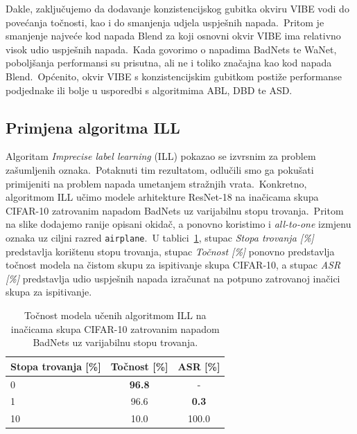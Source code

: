 \documentclass[diplomskirad]{fer}
\begin{document}
Dakle, zaključujemo da dodavanje konzistencijskog gubitka okviru VIBE vodi do povećanja točnosti, kao i do smanjenja udjela uspješnih napada.\ 
Pritom je smanjenje najveće kod napada Blend za koji osnovni okvir VIBE ima relativno visok udio uspješnih napada.\ 
Kada govorimo o napadima BadNets te WaNet, poboljšanja performansi su prisutna, ali ne i toliko značajna kao kod napada Blend.\ 
Općenito, okvir VIBE s konzistencijskim gubitkom postiže performanse podjednake ili bolje u usporedbi s algoritmima ABL, DBD te ASD.\

\subsection{Primjena algoritma ILL}
\label{sub:trovanje_ill}

Algoritam \textit{Imprecise label learning} (ILL) pokazao se izvrsnim za problem zašumljenih oznaka.\ Potaknuti tim rezultatom, odlučili smo ga pokušati primijeniti na problem napada umetanjem stražnjih vrata.\ 
Konkretno, algoritmom ILL učimo modele arhitekture ResNet-18 na inačicama skupa CIFAR-10 zatrovanim napadom BadNets uz varijabilnu stopu trovanja.\ 
Pritom na slike dodajemo ranije opisani okidač, a ponovno koristimo i \textit{all-to-one} izmjenu oznaka uz ciljni razred \texttt{airplane}.\ 
U tablici~\ref{tbl:trovanje_ill}, stupac \textit{Stopa trovanja [\%]} predstavlja korištenu stopu trovanja, stupac \textit{Točnost [\%]} ponovno predstavlja točnost modela na čistom skupu za ispitivanje skupa CIFAR-10, a stupac \textit{ASR [\%]} predstavlja udio uspješnih napada izračunat na potpuno zatrovanoj inačici skupa za ispitivanje.\  

\begin{table}[htb]
  \caption{Točnost modela učenih algoritmom ILL na inačicama skupa CIFAR-10 zatrovanim napadom BadNets uz varijabilnu stopu trovanja.}
  \label{tbl:trovanje_ill}
  \centering
  \begin{tabular}{l||cc}
  Stopa trovanja [\%] & Točnost [\%] & ASR [\%]\\ \hline \hline
  0 & \textbf{96.8} & - \\
  1 & 96.6 & \textbf{0.3} \\
  10 & 10.0 & 100.0 \\ 
  \end{tabular}
\end{table}
\end{document}
